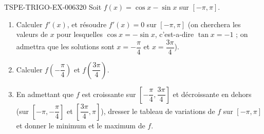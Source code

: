 \begin{exercice}{TSPE-TRIGO-EX-006}{3}{20}
Soit $f(x) = \cos x - \sin x$ sur $[-\pi, \pi]$.
\begin{enumerate}
  \item Calculer $f'(x)$, et résoudre $f'(x) = 0$ sur $[-\pi,\pi]$ (on cherchera les valeurs de $x$ pour lesquelles $\cos x = -\sin x$, c'est-a-dire $\tan x = -1$ ; on admettra que les solutions sont $x = -\dfrac{\pi}{4}$ et $x = \dfrac{3\pi}{4}$).
  \item Calculer $f\!\left(-\dfrac{\pi}{4}\right)$ et $f\!\left(\dfrac{3\pi}{4}\right)$.
  \item En admettant que $f$ est croissante sur $\left[-\dfrac{\pi}{4}, \dfrac{3\pi}{4}\right]$ et décroissante en dehors (sur $\left[-\pi,-\dfrac{\pi}{4}\right]$ et $\left[\dfrac{3\pi}{4},\pi\right]$), dresser le tableau de variations de $f$ sur $[-\pi,\pi]$ et donner le minimum et le maximum de $f$.
\end{enumerate}
\end{exercice}
